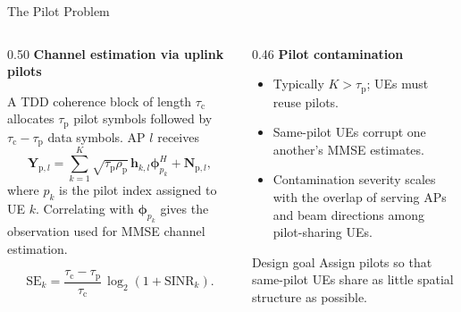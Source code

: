 \documentclass[10pt,aspectratio=169]{beamer}
\newcommand{\taup}{\tau_{\mathrm{p}}}
\newcommand{\tauc}{\tau_{\mathrm{c}}}
\newenvironment{tightitemize}{%
    \begin{itemize}
        \setlength{\itemsep}{2pt}
        \setlength{\parskip}{0pt}
        \setlength{\parsep}{0pt}
}{%
    \end{itemize}
}
\begin{document}
\begin{frame}{The Pilot Problem}
    \small
    \begin{columns}[T,onlytextwidth]
        \begin{column}{0.50\textwidth}
            \textbf{Channel estimation via uplink pilots}
            
            A TDD coherence block of length \(\tauc\) allocates \(\taup\) pilot symbols followed by \(\tauc-\taup\) data symbols. AP \(l\) receives
            \[
                \mathbf{Y}_{\mathrm{p},l}
                =
                \sum_{k=1}^{K}
                \sqrt{\taup\rho_{\mathrm{p}}}\,
                \mathbf{h}_{k,l}\boldsymbol{\phi}_{p_k}^{H}
                +
                \mathbf{N}_{\mathrm{p},l},
            \]
            where \(p_k\) is the pilot index assigned to UE \(k\). Correlating with \(\boldsymbol{\phi}_{p_k}\) gives the observation used for MMSE channel estimation.
            
            \vspace{0.4em}
            \[
                \mathrm{SE}_k = \frac{\tauc - \taup}{\tauc}\,\log_2(1+\mathrm{SINR}_k).
            \]
        \end{column}
        \begin{column}{0.46\textwidth}
            \textbf{Pilot contamination}
            \begin{tightitemize}
                \item Typically \(K>\taup\); UEs must reuse pilots.
                \item Same-pilot UEs corrupt one another's MMSE estimates.
                \item Contamination severity scales with the overlap of serving APs and beam directions among pilot-sharing UEs.
            \end{tightitemize}
            
            \vspace{0.45em}
            \begin{block}{Design goal}
                Assign pilots so that same-pilot UEs share as little spatial structure as possible.
            \end{block}
        \end{column}
    \end{columns}
\end{frame}
\end{document}

